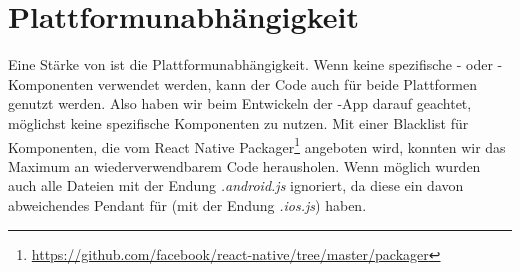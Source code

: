 \section{Plattformunabhängigkeit}
Eine Stärke von  ist die Plattformunabhängigkeit. 
Wenn keine spezifische - oder -Komponenten verwendet werden, kann der Code auch für beide Plattformen genutzt werden.
Also haben wir beim Entwickeln der -App darauf geachtet, möglichst keine spezifische Komponenten zu nutzen. 
Mit einer Blacklist für Komponenten, die vom React Native Packager\footnote{\url{https://github.com/facebook/react-native/tree/master/packager}} angeboten wird, konnten wir das Maximum an wiederverwendbarem Code herausholen. 
Wenn möglich wurden auch alle Dateien mit der Endung \textit{.android.js} ignoriert, da diese ein davon abweichendes Pendant für  (mit der Endung \textit{.ios.js}) haben.
